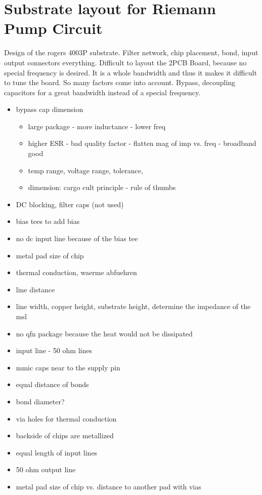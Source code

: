 \chapter{Substrate layout for Riemann Pump Circuit}
Design of the rogers 4003P substrate. Filter network, chip placement, bond, input output connectors everything. Difficult to layout the 2PCB Board, because no special frequency is desired. It is a whole bandwidth and thus it makes it difficult to tune the board. So many factors come into account. Bypass, decoupling capacitors for a great bandwidth instead of a special frequency. 
\begin{itemize}
	\item bypass cap dimension
	\begin{itemize}
		\item large package - more inductance - lower freq
		\item higher ESR - bad quality factor - flatten mag of imp vs. freq - broadband good
		\item temp range, voltage range, tolerance, 
		\item dimension: cargo cult principle - rule of thumbs
	\end{itemize}
	\item DC blocking, filter caps (not used) 
	\item bias tees to add bias 
	\item no dc input line because of the bias tee
	\item metal pad size of chip
	\item thermal conduction, waerme abfuehren
	\item line distance
	\item line width, copper height, substrate height, determine the impedance of the msl
	\item no qfn package because the heat would not be dissipated
	\item input line - 50 ohm lines
	\item mmic caps near to the supply pin
	\item equal distance of bonds
	\item bond diameter?
	\item via holes for thermal conduction
	\item backside of chips are metallized
	\item equal length of input lines
	\item 50 ohm output line
	\item metal pad size of chip vs. distance to another pad with vias

\end{itemize}

